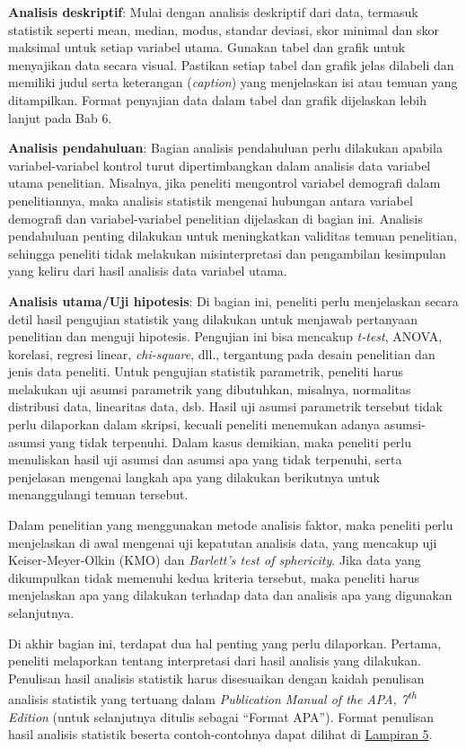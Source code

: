 \documentclass[
  indonesian,
  letterpaper,
]{scrbook}
\begin{document}
\textbf{Analisis deskriptif}: Mulai dengan analisis deskriptif dari
data, termasuk statistik seperti mean, median, modus, standar deviasi,
skor minimal dan skor maksimal untuk setiap variabel utama. Gunakan
tabel dan grafik untuk menyajikan data secara visual. Pastikan setiap
tabel dan grafik jelas dilabeli dan memiliki judul serta keterangan
(\emph{caption}) yang menjelaskan isi atau temuan yang ditampilkan.
Format penyajian data dalam tabel dan grafik dijelaskan lebih lanjut
pada Bab 6.

\textbf{Analisis pendahuluan}: Bagian analisis pendahuluan perlu
dilakukan apabila variabel-variabel kontrol turut dipertimbangkan dalam
analisis data variabel utama penelitian. Misalnya, jika peneliti
mengontrol variabel demografi dalam penelitiannya, maka analisis
statistik mengenai hubungan antara variabel demografi dan
variabel-variabel penelitian dijelaskan di bagian ini. Analisis
pendahuluan penting dilakukan untuk meningkatkan validitas temuan
penelitian, sehingga peneliti tidak melakukan misinterpretasi dan
pengambilan kesimpulan yang keliru dari hasil analisis data variabel
utama.

\textbf{Analisis utama/Uji hipotesis}: Di bagian ini, peneliti perlu
menjelaskan secara detil hasil pengujian statistik yang dilakukan untuk
menjawab pertanyaan penelitian dan menguji hipotesis. Pengujian ini bisa
mencakup \emph{t-test}, ANOVA, korelasi, regresi linear,
\emph{chi-square}, dll., tergantung pada desain penelitian dan jenis
data peneliti. Untuk pengujian statistik parametrik, peneliti harus
melakukan uji asumsi parametrik yang dibutuhkan, misalnya, normalitas
distribusi data, linearitas data, dsb. Hasil uji asumsi parametrik
tersebut tidak perlu dilaporkan dalam skripsi, kecuali peneliti
menemukan adanya asumsi-asumsi yang tidak terpenuhi. Dalam kasus
demikian, maka peneliti perlu menuliskan hasil uji asumsi dan asumsi apa
yang tidak terpenuhi, serta penjelasan mengenai langkah apa yang
dilakukan berikutnya untuk menanggulangi temuan tersebut.

Dalam penelitian yang menggunakan metode analisis faktor, maka peneliti
perlu menjelaskan di awal mengenai uji kepatutan analisis data, yang
mencakup uji Keiser-Meyer-Olkin (KMO) dan \emph{Barlett's test of
sphericity}. Jika data yang dikumpulkan tidak memenuhi kedua kriteria
tersebut, maka peneliti harus menjelaskan apa yang dilakukan terhadap
data dan analisis apa yang digunakan selanjutnya.

Di akhir bagian ini, terdapat dua hal penting yang perlu dilaporkan.
Pertama, peneliti melaporkan tentang interpretasi dari hasil analisis
yang dilakukan. Penulisan hasil analisis statistik harus disesuaikan
dengan kaidah penulisan analisis statistik yang tertuang dalam
\emph{Publication Manual of the APA, 7\textsuperscript{th} Edition}
(untuk selanjutnya ditulis sebagai ``Format APA''). Format penulisan
hasil analisis statistik beserta contoh-contohnya dapat dilihat di
\hyperref[_Lampiran_5_Format]{Lampiran 5}.
\end{document}

